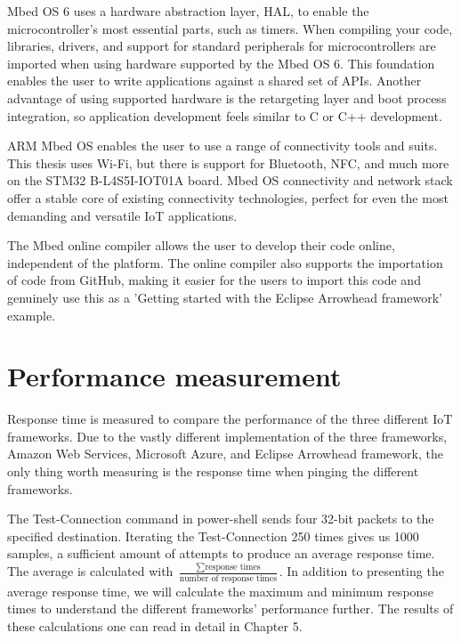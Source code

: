 Mbed OS 6 uses a hardware abstraction layer, HAL, to enable the microcontroller's most essential parts, such as timers.
When compiling your code,  libraries, drivers, and support for standard peripherals for microcontrollers are imported when using hardware supported by the Mbed OS 6.
This foundation enables the user to write applications against a shared set of APIs.
Another advantage of using supported hardware is the retargeting layer and boot process integration, so application development feels similar to C or C++ development.

ARM Mbed OS enables the user to use a range of connectivity tools and suits. This thesis uses Wi-Fi, but there is support for Bluetooth, NFC, and much more on the STM32 B-L4S5I-IOT01A board.
Mbed OS connectivity and network stack offer a stable core of existing connectivity technologies, perfect for even the most demanding and versatile IoT applications. 

The Mbed online compiler allows the user to develop their code online, independent of the platform. 
The online compiler also supports the importation of code from GitHub, making it easier for the users to import this code and genuinely use this as a 'Getting started with the Eclipse Arrowhead framework' example. 


\section{Performance measurement}
Response time is measured to compare the performance of the three different IoT frameworks.  
Due to the vastly different implementation of the three frameworks, Amazon Web Services, Microsoft Azure, and Eclipse Arrowhead framework, the only thing worth measuring is the response time when pinging the different frameworks.

The Test-Connection command in power-shell sends four 32-bit packets to the specified destination. 
Iterating the Test-Connection 250 times gives us 1000 samples, a sufficient amount of attempts to produce an average response time.
The average is calculated with $\frac{\sum \text{response times}}{\text{number of response times}}$.
In addition to presenting the average response time, we will calculate the maximum and minimum response times to understand the different frameworks' performance further. 
The results of these calculations one can read in detail in Chapter 5.



 
